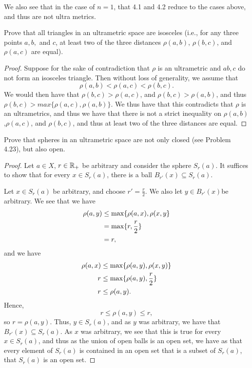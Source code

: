 We also see that in the case of $n=1$, that 4.1 and 4.2 reduce to the
cases above, and thus are not ultra metrics.

\begin{majorEx}%
    Prove that all triangles in an ultrametric space are isosceles (i.e., for
    any three points $a,b,$ and $c$, at least two of the three distances
    $\rho(a,b)$, $\rho(b,c)$, and $\rho(a, c)$ are equal).
\end{majorEx}

\begin{proof}
    Suppose for the sake of contradiction that $\rho$ is an ultrametric and $a
    b, c$ do not form an isosceles triangle. Then without loss of
    generality, we assume that
    \[
        \rho(a,b) < \rho(a,c) < \rho(b,c).
    \]
    We would then have that 
    $\rho(b,c)>\rho(a,c) $, and $\rho(b,c)>\rho(a,b)$, and thus
    $\rho(b,c)> max\{\rho(a,c), \rho(a,b)\}$. We thus have that
    this contradicts that $\rho$ is an ultrametrics, and thus we have
    that there is not a strict inequality on $\rho(a,b)$,$\rho(a,c)$,
    and $\rho(b,c)$, and thus at least two of the three distances 
    are equal.    
\end{proof}

\begin{majorEx}%
    Prove that spheres in an ultrametric space are not only closed (see Problem
    4.23), but also open.
\end{majorEx}

\begin{proof}
    Let $a \in X$, $r \in \mathbb{R}_+$ be arbitrary and consider the sphere $S_r(a)$.
    It suffices to show that for every $x \in S_r(a)$, there is a ball $B_{r'}(x)
    \subseteq S_r(a)$. 

    Let $x \in S_r(a)$ be arbitrary, and choose $r' = \frac{r}{2}$. We
    also let $y\in B_{r'}(x)$be arbitrary. We see that we have
    \begin{align*}
        \rho(a, y) &\leq \max \{\rho(a, x), \rho(x, y\} \\
        &= \max \{r, \frac{r}{2}\} \\
        &= r,
    \end{align*}
    and we have
    \begin{align*}
        \rho(a, x) &\leq \max \{\rho(a, y), \rho(x, y)\} \\
        r &\leq \max \{\rho(a, y), \frac{r}{2}\} \\
        r &\leq \rho(a, y).
    \end{align*}
    Hence,
    \[
        r \leq \rho(a, y) \leq r,
    \]
    so $r = \rho(a, y)$. Thus, $y \in S_{r}(a)$, and as $y$ was
    arbitrary, we have that $B_{r'}(x) \subseteq S_r(a)$. As $x$ was
    arbitrary, we see that this is true for every $x \in S_r(a)$, and
    thus as the union of open balls is an open set, we have as that every
    element of $S_r(a)$ is contained in an open set that is a subset
    of $S_r(a)$, that $S_r(a)$ is an open set.

\end{proof}



